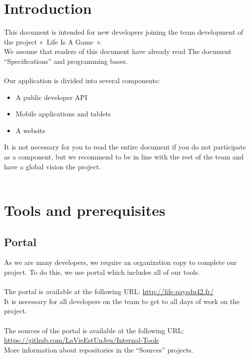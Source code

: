 \documentclass{life-fr}
\begin{document}
\newpage

\tableofcontents


\chapter{Introduction}

This document is intended for new developers joining the team
development of the project «~Life Is A Game~».\\
We assume that readers of this document have already read
The document ``Specifications'' and programming bases.\\
\\
Our application is divided into several components:
\begin{itemize}
  \item A public developer API
  \item Mobile applications and tablets
  \item A website
\end{itemize}
It is not necessary for you to read the entire document
if you do not participate as a component, but we recommend
to be in line with the rest of the team and have a global vision
the project.\\
\\


\chapter{Tools and prerequisites}

\section{Portal}

As we are many developers, we require an organization
copy to complete our project. To do this, we use portal
which includes all of our tools.\\
\\
The portal is available at the following URL:
\url{http://life.paysdu42.fr/} \\
It is necessary for all developers on the team to get to all
days of work on the project.\\
\\
The sources of the portal is available at the following URL:
\url{https://github.com/LaVieEstUnJeu/Internal-Tools} \\
More information about repositories in the ``Sources'' projects.
\end{document}
